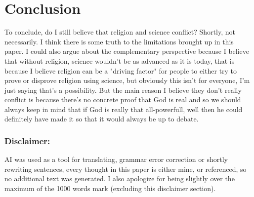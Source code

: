 \documentclass[a4paper,12pt,twoside]{report}
\begin{document}
\chapter{Conclusion}
To conclude, do I still believe that religion and science conflict? Shortly, not necessarily. I think there is some truth to the limitations brought up in this paper. I could also argue about the complementary perspective because I believe that without religion, science wouldn't be as advanced as it is today, that is because I believe religion can be a "driving factor" for people to either try to prove or disprove religion using science, but obviously this isn't for everyone, I'm just saying that's a possibility.
But the main reason I believe they don't really conflict is because there's no concrete proof that God is real and so we should always keep in mind that if God is really that all-powerfull, well then he could definitely have made it so that it would always be up to debate.
\subsection*{Disclaimer:}
AI was used as a tool for translating, grammar error correction or shortly rewriting sentences, every thought in this paper is either mine, or referenced, so no additional text was generated. I also apologize for being slightly over the maximum of the 1000 words mark (excluding this disclaimer section).
\newpage
\nocite{depoortere2023living}
\printbibliography[heading=bibnumbered] %
\end{document}
